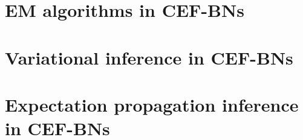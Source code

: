 \documentclass[11pt, oneside]{article}   	%
\numberwithin{figure}{section}
\numberwithin{equation}{section}
\numberwithin{table}{section}
\theoremstyle{definition}
\begin{document}
\section{EM algorithms in CEF-BNs}


\section{Variational inference in CEF-BNs}

\section{Expectation propagation inference in CEF-BNs}
\end{document}
